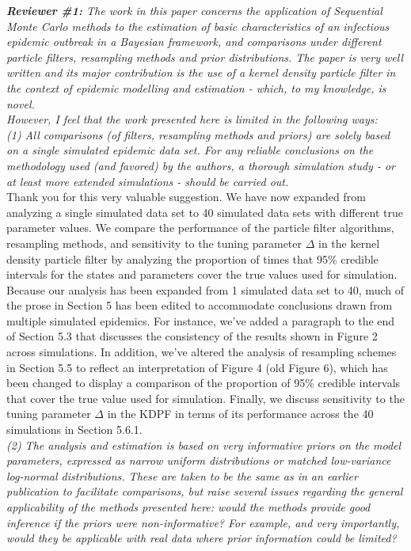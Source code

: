 \documentclass{article}
\begin{document}
\noindent \emph{{\bf Reviewer \#1:} The work in this paper concerns the application of Sequential Monte Carlo methods to the estimation of basic characteristics of an infectious epidemic outbreak in a Bayesian framework, and comparisons under different particle filters, resampling methods and prior distributions. The paper is very well written and its major contribution is the use of a kernel density particle filter in the context of epidemic modelling and estimation - which, to my knowledge, is novel.} \\

\noindent \emph{However, I feel that the work presented here is limited in the following ways:} \\

\noindent \emph{(1) All comparisons (of filters, resampling methods and priors) are solely based on a single simulated epidemic data set. For any reliable conclusions on the methodology used (and favored) by the authors, a thorough simulation study - or at least more extended simulations - should be carried out.} \\

Thank you for this very valuable suggestion. We have now expanded from analyzing a single simulated data set to 40 simulated data sets with different true parameter values. We compare the performance of the particle filter algorithms, resampling methods, and sensitivity to the tuning parameter $\Delta$ in the kernel density particle filter by analyzing the proportion of times that 95\% credible intervals for the states and parameters cover the true values used for simulation. Because our analysis has been expanded from 1 simulated data set to 40, much of the prose in Section 5 has been edited to accommodate conclusions drawn from multiple simulated epidemics. For instance, we've added a paragraph to the end of Section 5.3 that discusses the consistency of the results shown in Figure 2 across simulations. In addition, we've altered the analysis of resampling schemes in Section 5.5 to reflect an interpretation of Figure 4 (old Figure 6), which has been changed to display a comparison of the proportion of 95\% credible intervals that cover the true value used for simulation. Finally, we discuss sensitivity to the tuning parameter $\Delta$ in the KDPF in terms of its performance across the 40 simulations in Section 5.6.1.  \\

\noindent \emph{(2) The analysis and estimation is based on very informative priors on the model parameters, expressed as narrow uniform distributions or matched low-variance log-normal distributions. These are taken to be the same as in an earlier publication to facilitate comparisons, but raise several issues regarding the general applicability of the methods presented here: would the methods provide good inference if the priors were non-informative? For example, and very importantly, would they be applicable with real data where prior information could be limited?} \\
\end{document}
